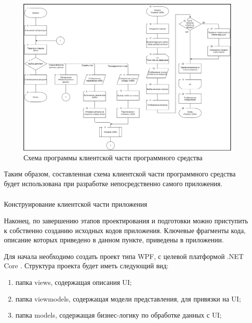 \begin{figure}
\centering
	\includegraphics[scale=0.65]{attachments/game_play_alg.png}
	\caption{Схема программы клиентской части программного средства}
	\label{fig:design:client:ux:game_play_alg}
\end{figure}

Таким образом, составленная схема клиентской части программного средства будет использована при разработке непосредственно самого приложения.

\subsubsection{} Конструирование клиентской части приложения
\label{sec:design:client:development}

Наконец, по завершению этапов проектирования и подготовки можно приступить к собственно созданию исходных кодов приложения. Ключевые фрагменты кода, описание которых приведено в данном пункте, приведены в приложении.

Для начала необходимо создать проект типа WPF, с целевой платформой .NET Core \cite{clr_csharp}. Структура проекта будет иметь следующий вид:

\begin{enumerate}
	\item папка views, содержащая описания UI;
	\item папка viewmodels, содержащая модели представления, для привязки на UI;
	\item папка models, содержащая бизнес-логику по обработке данных с UI;
\end{enumerate}

